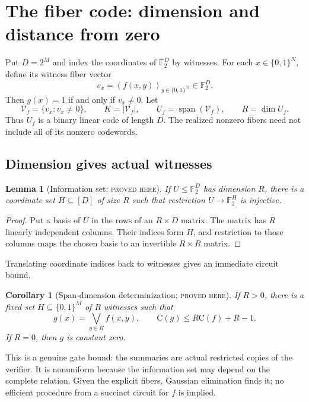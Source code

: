\documentclass[11pt]{article}
\newtheorem{lemma}[lemma]{Lemma}
\newtheorem{corollary}[corollary]{Corollary}
\theoremstyle{definition}
\theoremstyle{remark}
\newcommand{\bits}{\{0,1\}}
\newcommand{\F}{\mathbb F}
\newcommand{\C}{\mathrm C}
\newcommand{\Span}{\operatorname{span}}
\newcommand{\status}[1]{\textsc{#1}}
\begin{document}
\section{The fiber code: dimension and distance from zero}
\label{sec:fiber-code}

Put $D=2^M$ and index the coordinates of $\F_2^D$ by witnesses.  For each
$x\in\bits^N$, define its witness fiber vector
\[
  v_x=(f(x,y))_{y\in\bits^M}\in\F_2^D.
  \tag{3.1}\label{eq:fiber-vector}
\]
Then $g(x)=1$ if and only if $v_x\ne0$.  Let
\[
  \mathcal V_f=\{v_x:v_x\ne0\},\qquad
  K=|\mathcal V_f|,
  \qquad
  U_f=\Span(\mathcal V_f),\qquad
  R=\dim U_f.
  \tag{3.2}\label{eq:fiber-parameters}
\]
Thus $U_f$ is a binary linear code of length $D$.  The realized nonzero
fibers need not include all of its nonzero codewords.

\subsection{Dimension gives actual witnesses}

\begin{lemma}[Information set; \status{proved here}]
\label{lem:information-set}
If $U\le\F_2^D$ has dimension $R$, there is a coordinate set
$H\subseteq[D]$ of size $R$ such that restriction $U\to\F_2^H$ is injective.
\end{lemma}

\begin{proof}
Put a basis of $U$ in the rows of an $R\times D$ matrix.  The matrix has $R$
linearly independent columns.  Their indices form $H$, and restriction to
those columns maps the chosen basis to an invertible $R\times R$ matrix.
\end{proof}

Translating coordinate indices back to witnesses gives an immediate circuit
bound.

\begin{corollary}[Span-dimension determinization; \status{proved here}]
\label{cor:span-bound}
If $R>0$, there is a fixed set $H\subseteq\bits^M$ of $R$ witnesses such that
\[
  g(x)=\bigvee_{y\in H}f(x,y),
  \qquad
  \C(g)\le R\C(f)+R-1.
  \tag{3.3}\label{eq:span-bound}
\]
If $R=0$, then $g$ is constant zero.
\end{corollary}

This is a genuine gate bound: the summaries are actual restricted copies of
the verifier.  It is nonuniform because the information set may depend on the
complete relation.  Given the explicit fibers, Gaussian elimination finds it;
no efficient procedure from a succinct circuit for $f$ is implied.
\end{document}
